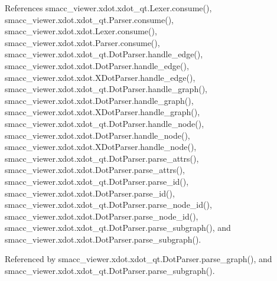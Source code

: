 References smacc\+\_\+viewer.\+xdot.\+xdot\+\_\+qt.\+Lexer.\+consume(), smacc\+\_\+viewer.\+xdot.\+xdot\+\_\+qt.\+Parser.\+consume(), smacc\+\_\+viewer.\+xdot.\+xdot.\+Lexer.\+consume(), smacc\+\_\+viewer.\+xdot.\+xdot.\+Parser.\+consume(), smacc\+\_\+viewer.\+xdot.\+xdot\+\_\+qt.\+Dot\+Parser.\+handle\+\_\+edge(), smacc\+\_\+viewer.\+xdot.\+xdot.\+Dot\+Parser.\+handle\+\_\+edge(), smacc\+\_\+viewer.\+xdot.\+xdot.\+X\+Dot\+Parser.\+handle\+\_\+edge(), smacc\+\_\+viewer.\+xdot.\+xdot\+\_\+qt.\+Dot\+Parser.\+handle\+\_\+graph(), smacc\+\_\+viewer.\+xdot.\+xdot.\+Dot\+Parser.\+handle\+\_\+graph(), smacc\+\_\+viewer.\+xdot.\+xdot.\+X\+Dot\+Parser.\+handle\+\_\+graph(), smacc\+\_\+viewer.\+xdot.\+xdot\+\_\+qt.\+Dot\+Parser.\+handle\+\_\+node(), smacc\+\_\+viewer.\+xdot.\+xdot.\+Dot\+Parser.\+handle\+\_\+node(), smacc\+\_\+viewer.\+xdot.\+xdot.\+X\+Dot\+Parser.\+handle\+\_\+node(), smacc\+\_\+viewer.\+xdot.\+xdot\+\_\+qt.\+Dot\+Parser.\+parse\+\_\+attrs(), smacc\+\_\+viewer.\+xdot.\+xdot.\+Dot\+Parser.\+parse\+\_\+attrs(), smacc\+\_\+viewer.\+xdot.\+xdot\+\_\+qt.\+Dot\+Parser.\+parse\+\_\+id(), smacc\+\_\+viewer.\+xdot.\+xdot.\+Dot\+Parser.\+parse\+\_\+id(), smacc\+\_\+viewer.\+xdot.\+xdot\+\_\+qt.\+Dot\+Parser.\+parse\+\_\+node\+\_\+id(), smacc\+\_\+viewer.\+xdot.\+xdot.\+Dot\+Parser.\+parse\+\_\+node\+\_\+id(), smacc\+\_\+viewer.\+xdot.\+xdot\+\_\+qt.\+Dot\+Parser.\+parse\+\_\+subgraph(), and smacc\+\_\+viewer.\+xdot.\+xdot.\+Dot\+Parser.\+parse\+\_\+subgraph().



Referenced by smacc\+\_\+viewer.\+xdot.\+xdot\+\_\+qt.\+Dot\+Parser.\+parse\+\_\+graph(), and smacc\+\_\+viewer.\+xdot.\+xdot\+\_\+qt.\+Dot\+Parser.\+parse\+\_\+subgraph().


